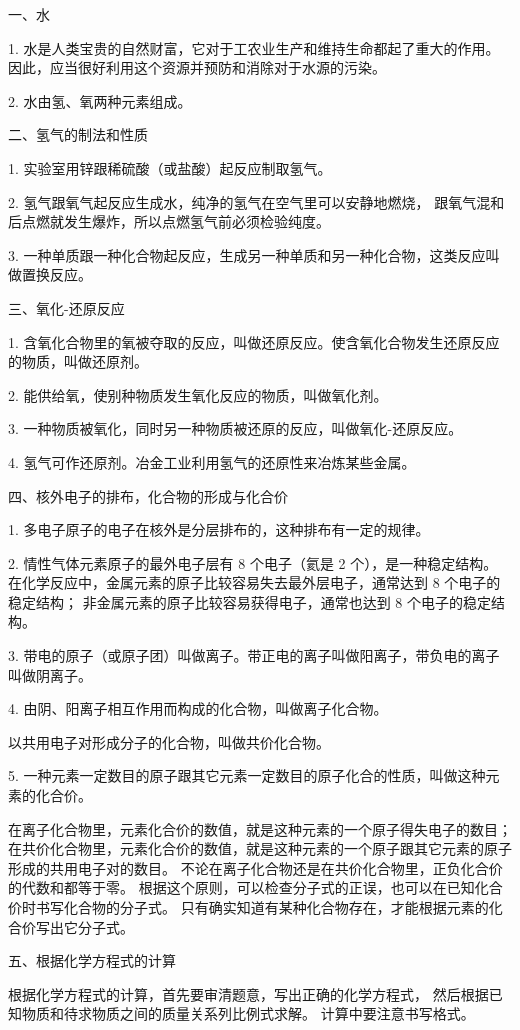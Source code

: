 \xiaojie

一、水

1. 水是人类宝贵的自然财富，它对于工农业生产和维持生命都起了重大的作用。因此，应当很好利用这个资源并预防和消除对于水源的污染。

2. 水由氢、氧两种元素组成。



二、氢气的制法和性质

1. 实验室用锌跟稀硫酸（或盐酸）起反应制取氢气。

2. 氢气跟氧气起反应生成水，纯净的氢气在空气里可以安静地燃烧，
跟氧气混和后点燃就发生爆炸，所以点燃氢气前必须检验纯度。

3. 一种单质跟一种化合物起反应，生成另一种单质和另一种化合物，这类反应叫做置换反应。


三、氧化-还原反应

1. 含氧化合物里的氧被夺取的反应，叫做还原反应。使含氧化合物发生还原反应的物质，叫做还原剂。

2. 能供给氧，使别种物质发生氧化反应的物质，叫做氧化剂。

3. 一种物质被氧化，同时另一种物质被还原的反应，叫做氧化-还原反应。

4. 氢气可作还原剂。冶金工业利用氢气的还原性来冶炼某些金属。


四、核外电子的排布，化合物的形成与化合价

1. 多电子原子的电子在核外是分层排布的，这种排布有一定的规律。

2. 情性气体元素原子的最外电子层有 8 个电子（氦是 2 个），是一种稳定结构。
在化学反应中，金属元素的原子比较容易失去最外层电子，通常达到 8 个电子的稳定结构；
非金属元素的原子比较容易获得电子，通常也达到 8 个电子的稳定结构。

3. 带电的原子（或原子团）叫做离子。带正电的离子叫做阳离子，带负电的离子叫做阴离子。

4. 由阴、阳离子相互作用而构成的化合物，叫做离子化合物。

以共用电子对形成分子的化合物，叫做共价化合物。


5. 一种元素一定数目的原子跟其它元素一定数目的原子化合的性质，叫做这种元素的化合价。

在离子化合物里，元素化合价的数值，就是这种元素的一个原子得失电子的数目；
在共价化合物里，元素化合价的数值，就是这种元素的一个原子跟其它元素的原子形成的共用电子对的数目。
不论在离子化合物还是在共价化合物里，正负化合价的代数和都等于零。
根据这个原则，可以检查分子式的正误，也可以在已知化合价时书写化合物的分子式。
只有确实知道有某种化合物存在，才能根据元素的化合价写出它分子式。


五、根据化学方程式的计算

根据化学方程式的计算，首先要审清题意，写出正确的化学方程式，
然后根据已知物质和待求物质之间的质量关系列比例式求解。
计算中要注意书写格式。

